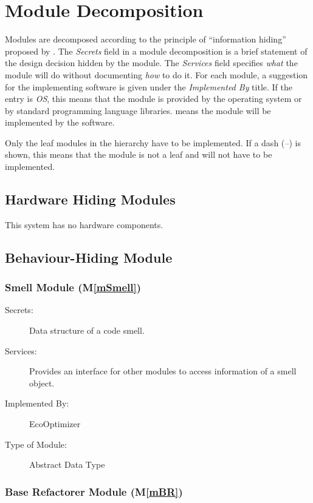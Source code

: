 \documentclass[12pt, titlepage]{article}
\newcommand{\mref}[1]{M\ref{#1}}
\begin{document}
\section{Module Decomposition} \label{SecMD}

Modules are decomposed according to the principle of ``information hiding''
proposed by \citet{ParnasEtAl1984}. The \emph{Secrets} field in a module
decomposition is a brief statement of the design decision hidden by the
module. The \emph{Services} field specifies \emph{what} the module will do
without documenting \emph{how} to do it. For each module, a suggestion for the
implementing software is given under the \emph{Implemented By} title. If the
entry is \emph{OS}, this means that the module is provided by the operating
system or by standard programming language libraries.  \emph{\progname{}} means the
module will be implemented by the \progname{} software.

Only the leaf modules in the hierarchy have to be implemented. If a dash
(\emph{--}) is shown, this means that the module is not a leaf and will not have
to be implemented.

\subsection{Hardware Hiding Modules}

This system has no hardware components.

\subsection{Behaviour-Hiding Module}

\subsubsection{Smell Module (\mref{mSmell})}

\begin{description}
\item[Secrets:] Data structure of a code smell.
\item[Services:] Provides an interface for other modules to access information of a smell object.
\item[Implemented By:] EcoOptimizer
\item[Type of Module:] Abstract Data Type
\end{description}

\subsubsection{Base Refactorer Module (\mref{mBR})}
\end{document}
